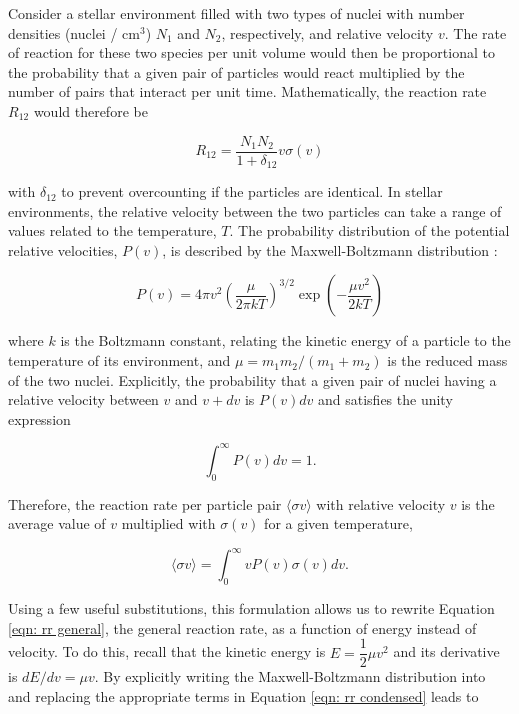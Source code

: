 Consider a stellar environment filled with two types of nuclei with number densities (nuclei / cm$^{3}$) $N_{1}$ and $N_{2}$, respectively, and relative velocity $v$. The rate of reaction for these two species per unit volume would then be proportional to the probability that a given pair of particles would react multiplied by the number of pairs that interact per unit time. Mathematically, the reaction rate $R_{12}$ would therefore be

\begin{equation}
R_{12} = \dfrac{N_{1} N_{2}}{1+\delta_{12}} v \sigma (v)
\label{eqn: rr general}
\end{equation}

\noindent with $\delta_{12}$ to prevent overcounting if the particles are identical. In stellar environments, the relative velocity between the two particles can take a range of values related to the temperature, $T$. The probability distribution of the potential relative velocities, $P(v)$, is described by the Maxwell-Boltzmann distribution \cite{RyanNortonBook}: 

\begin{equation}
P(v) = 4 \pi v^{2} \left( \dfrac{\mu}{2\pi k T} \right)^{3/2} \exp \left( - \dfrac{\mu v^{2}}{2 k T} \right)
\label{eqn: mb distribution}
\end{equation}

\noindent where $k$ is the Boltzmann constant, relating the kinetic energy of a particle to the temperature of its environment, and $\mu = m_{1}m_{2}/(m_{1}+m_{2})$ is the reduced mass of the two nuclei. Explicitly, the probability that a given pair of nuclei having a relative velocity between $v$ and $v+dv$ is $P(v)dv$ and satisfies the unity expression

\begin{equation}
\int_{0}^{\infty} P(v) dv = 1.
\end{equation}

Therefore, the reaction rate per particle pair $\langle \sigma v \rangle$ with relative velocity $v$ is the average value of $v$ multiplied with $\sigma(v)$ for a given temperature,

\begin{equation}
\langle \sigma v \rangle = \int_{0}^{\infty} v P(v) \sigma(v) dv.
\label{eqn: rr condensed}
\end{equation}

\noindent Using a few useful substitutions, this formulation allows us to rewrite Equation \ref{eqn: rr general}, the general reaction rate, as a function of energy instead of velocity. To do this, recall that the kinetic energy is $E = \dfrac{1}{2} \mu v^{2}$ and its derivative is $dE / dv = \mu v$. By explicitly writing the Maxwell-Boltzmann distribution into and replacing the appropriate terms in Equation \ref{eqn: rr condensed} leads to 

